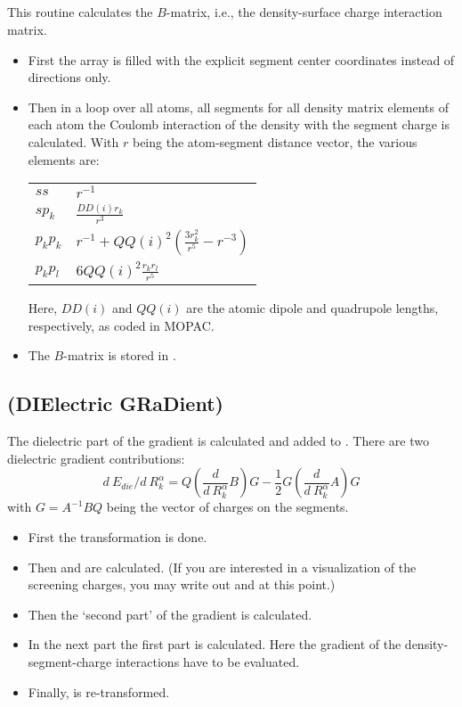 \subsection*{}
This routine calculates the $B$-matrix, i.e., the density-surface charge
interaction matrix.
\begin{itemize}
\item First the array  is filled with the explicit segment center
coordinates instead of directions only.

\item Then in a loop over all atoms, all segments for all density matrix
elements of each atom the Coulomb interaction of the density with the segment
charge is calculated.  With $r$ being the atom-segment distance vector, the
various elements are:
\begin{center}
\begin{tabular}{ll}\hline
$ss$ & $r^{-1}$ \\
$sp_k$ & $\frac{DD(i)r_k}{r^3}$ \\
$p_kp_k$ & $r^{-1}+QQ(i)^2(\frac{3r_k^2}{r^5}-r^{-3})$ \\
$p_kp_l$ & $6QQ(i)^2\frac{r_kr_l}{r^5}$ \\ 
\hline
\end{tabular}
\end{center}
  
Here, $DD(i)$ and $QQ(i)$ are the atomic dipole and quadrupole lengths, 
respectively, as coded in MOPAC.
\item The $B$-matrix is stored in .
\end{itemize}


\subsection*{ (DIElectric GRaDient)}
The dielectric part of the gradient is calculated and added to .
There are two dielectric gradient contributions:
$$
d\ E_{die}/d\ R_k^{\alpha} = Q(\frac{d}{d\ R_k^{\alpha}}B)G -
 \frac{1}{2}G(\frac{d}{d\ R_k^{\alpha}}A)G
$$
with $G=A^{-1}BQ$ being the vector of charges on the segments.
\begin{itemize}
\item First the  transformation is done.
\item Then  and  are calculated. (If you are interested in 
a visualization of the screening charges, you may write out  and 
 at this point.)
\item Then the `second part' of the gradient is calculated.
\item In the next part the first part is calculated.  Here the gradient of the
density-segment-charge interactions have to be evaluated.

\item Finally,  is re-transformed.
\end{itemize}

